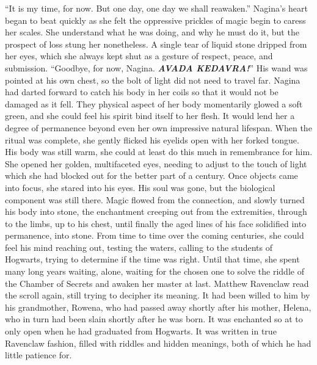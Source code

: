 “It is my time, for now. But one day, one day we shall reawaken.”
\SmallVSpace
Nagina’s heart began to beat quickly as she felt the oppressive prickles of magic begin to caress her scales. She understand what he was doing, and why he must do it, but the prospect of loss stung her nonetheless. A single tear of liquid stone dripped from her eyes, which she always kept shut as a gesture of respect, peace, and submission.
\SmallVSpace
“Goodbye, for now, Nagina. \emph{\textbf{AVADA KEDAVRA!}}”
\SmallVSpace
His wand was pointed at his own chest, so the bolt of light did not need to travel far. Nagina had darted forward to catch his body in her coils so that it would not be damaged as it fell. They physical aspect of her body momentarily glowed a soft green, and she could feel his spirit bind itself to her flesh. It would lend her a degree of permanence beyond even her own impressive natural lifespan.
\SmallVSpace
When the ritual was complete, she gently flicked his eyelids open with her forked tongue. His body was still warm, she could at least do this much in remembrance for him. She opened her golden, multifaceted eyes, needing to adjust to the touch of light which she had blocked out for the better part of a century. Once objects came into focus, she stared into his eyes. His soul was gone, but the biological component was still there. Magic flowed from the connection, and slowly turned his body into stone, the enchantment creeping out from the extremities, through to the limbs, up to his chest, until finally the aged lines of his face solidified into permanence, into stone.
\SomeVSpace
From time to time over the coming centuries, she could feel his mind reaching out, testing the waters, calling to the students of Hogwarts, trying to determine if the time was right. Until that time, she spent many long years waiting, alone, waiting for the chosen one to solve the riddle of the Chamber of Secrets and awaken her master at last.
\simpleline
{}
Matthew Ravenclaw read the scroll again, still trying to decipher its meaning. It had been willed to him by his grandmother, Rowena, who had passed away shortly after his mother, Helena, who in turn had been slain shortly after he was born. It was enchanted so at to only open when he had graduated from Hogwarts. It was written in true Ravenclaw fashion, filled with riddles and hidden meanings, both of which he had little patience for.
